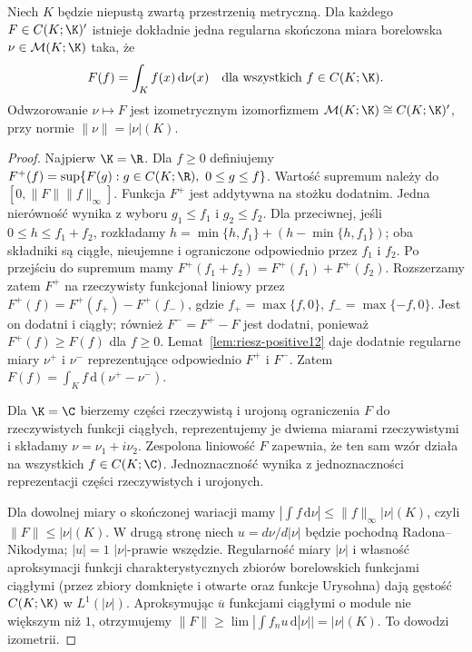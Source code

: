 \begin{twierdzenie}
\label{thm:riesz-markov12}
Niech $K$ będzie niepustą zwartą przestrzenią metryczną.
Dla każdego $F\in C(K;\K)'$ istnieje dokładnie jedna
regularna skończona miara borelowska $\nu\in\mathcal M(K;\K)$
taka, że
\[
 F(f)=\int_K f(x)\,\mathrm d\nu(x)
 \quad\text{dla wszystkich }f\in C(K;\K).
\]
Odwzorowanie $\nu\mapsto F$ jest izometrycznym izomorfizmem
$\mathcal M(K;\K)\cong C(K;\K)'$, przy normie
$\|\nu\|=|\nu|(K)$.
\end{twierdzenie}
\begin{proof}
Najpierw $\K=\R$. Dla $f\ge0$ definiujemy
$F^+(f)=\sup\{F(g):g\in C(K;\R),\ 0\le g\le f\}$.
Wartość supremum należy do $[0,\|F\|\|f\|_\infty]$.
Funkcja $F^+$ jest addytywna na stożku dodatnim.
Jedna nierówność wynika z wyboru $g_1\le f_1$ i
$g_2\le f_2$. Dla przeciwnej, jeśli
$0\le h\le f_1+f_2$, rozkładamy
$h=\min\{h,f_1\}+(h-\min\{h,f_1\})$;
oba składniki są ciągłe, nieujemne i ograniczone odpowiednio
przez $f_1$ i $f_2$. Po przejściu do supremum mamy
$F^+(f_1+f_2)=F^+(f_1)+F^+(f_2)$.
Rozszerzamy zatem $F^+$ na rzeczywisty funkcjonał liniowy
przez $F^+(f)=F^+(f_+)-F^+(f_-)$, gdzie
$f_+=\max\{f,0\}$, $f_-=\max\{-f,0\}$.
Jest on dodatni i ciągły; również $F^-=F^+-F$ jest dodatni,
ponieważ $F^+(f)\ge F(f)$ dla $f\ge0$.
Lemat~\ref{lem:riesz-positive12} daje dodatnie regularne miary
$\nu^+$ i $\nu^-$ reprezentujące odpowiednio $F^+$ i $F^-$.
Zatem $F(f)=\int_Kf\,\mathrm d(\nu^+-\nu^-)$.

Dla $\K=\C$ bierzemy części rzeczywistą i urojoną
ograniczenia $F$ do rzeczywistych funkcji ciągłych,
reprezentujemy je dwiema miarami rzeczywistymi i składamy
$\nu=\nu_1+i\nu_2$. Zespolona liniowość $F$ zapewnia,
że ten sam wzór działa na wszystkich $f\in C(K;\C)$.
Jednoznaczność wynika z jednoznaczności reprezentacji
części rzeczywistych i urojonych.

Dla dowolnej miary o skończonej wariacji mamy
$|\int f\,\mathrm d\nu|\le\|f\|_\infty|\nu|(K)$,
czyli $\|F\|\le|\nu|(K)$. W drugą stronę niech
$u=d\nu/d|\nu|$ będzie pochodną Radona--Nikodyma;
$|u|=1$ $|\nu|$-prawie wszędzie. Regularność miary
$|\nu|$ i własność aproksymacji funkcji charakterystycznych zbiorów
borelowskich funkcjami ciągłymi (przez zbiory domknięte
i otwarte oraz funkcje Urysohna) dają gęstość $C(K;\K)$
w $L^1(|\nu|)$. Aproksymując $\overline u$ funkcjami
ciągłymi o module nie większym niż $1$, otrzymujemy
$\|F\|\ge\lim|\int f_nu\,\mathrm d|\nu||=|\nu|(K)$.
To dowodzi izometrii.
\end{proof}

